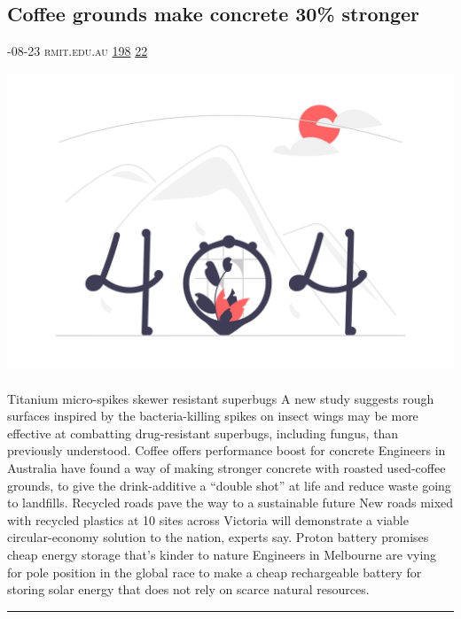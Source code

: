 \documentclass[10pt,a4paper]{article}
\begin{document}
\begin{multicols*}{2}
\begin{minipage}{\linewidth}
\subsection{Coffee grounds make concrete 30\% stronger}
\textsc{\footnotesize
{\scriptsize\faCalendar}-08-23 
{\scriptsize\faGlobe}\space 
rmit.edu.au 
{\scriptsize\faThumbsOUp}\space 
\href{http://news.ycombinator.com/item?id=37234404\&utm\_term=comment}{198} 
{\scriptsize\faComments}\space 
\href{http://news.ycombinator.com/item?id=37234404\&utm\_term=comment}{22} 
}
\par\medskip\noindent
\href{https://www.rmit.edu.au/news/all-news/2023/aug/coffee-concrete?utm\_source=hackernewsletter\&utm\_medium=email\&utm\_term=learn}{
    \includegraphics[width=0.99\linewidth]{notfound.png}
}
\end{minipage}
\paragraph{}
Titanium micro-spikes skewer resistant superbugs
A new study suggests rough surfaces inspired by the bacteria-killing spikes on insect wings may be more effective at combatting drug-resistant superbugs, including fungus, than previously understood.
Coffee offers performance boost for concrete
Engineers in Australia have found a way of making stronger concrete with roasted used-coffee grounds, to give the drink-additive a “double shot” at life and reduce waste going to landfills.
Recycled roads pave the way to a sustainable future
New roads mixed with recycled plastics at 10 sites across Victoria will demonstrate a viable circular-economy solution to the nation, experts say.
Proton battery promises cheap energy storage that’s kinder to nature
Engineers in Melbourne are vying for pole position in the global race to make a cheap rechargeable battery for storing solar energy that does not rely on scarce natural resources.
\par\noindent\textcolor{red}{\rule{\linewidth}{0.2mm}}
\vfill
\null
\end{multicols*}
\end{document}
